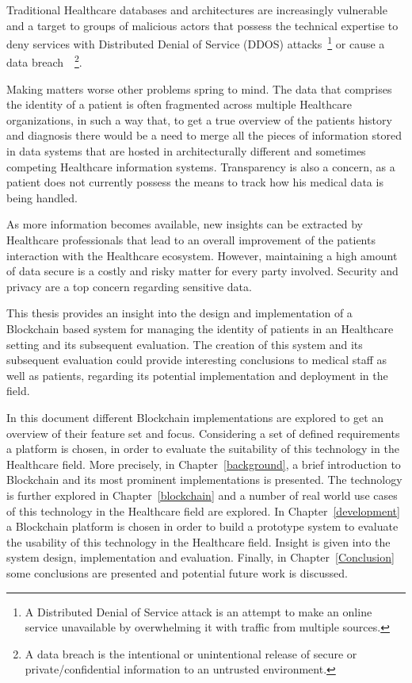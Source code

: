 Traditional Healthcare databases and architectures are increasingly vulnerable
and a target to groups of malicious actors that possess the technical expertise
to deny services with Distributed Denial of Service (DDOS) attacks~\footnote{A
Distributed Denial of Service attack is an attempt to make an online service
unavailable by overwhelming it with traffic from multiple sources.} or cause a
data breach~\cite{mcCoy2018}~\footnote{A data breach is the intentional or
unintentional release of secure or private/confidential information to an
untrusted environment.}. 

Making matters worse other problems spring to mind. The data that comprises the
identity of a patient is often fragmented across multiple Healthcare
organizations, in such a way that, to get a true overview of the patients
history and diagnosis there would be a need to merge all the pieces of
information stored in data systems that are hosted in architecturally different
and sometimes competing Healthcare information systems. Transparency is also a
concern, as a patient does not currently possess the means to track how his
medical data is being handled.

As more information becomes available, new insights can be extracted by
Healthcare professionals that lead to an overall improvement of the patients
interaction with the Healthcare ecosystem. However, maintaining a high amount
of data secure is a costly and risky matter for every party involved. Security
and privacy are a top concern regarding sensitive data. 

This thesis provides an insight into the design and implementation of a
Blockchain based system for managing the identity of patients in an Healthcare
setting and its subsequent evaluation. The creation of this system and its
subsequent evaluation could provide interesting conclusions to medical staff as
well as patients, regarding its potential implementation and deployment in the
field.

In this document different Blockchain implementations are explored to get an
overview of their feature set and focus. Considering a set of defined
requirements a platform is chosen, in order to evaluate the suitability of this
technology in the Healthcare field. More precisely, in
Chapter~\ref{background}, a brief introduction to Blockchain and its most
prominent implementations is presented. The technology is further explored in
Chapter~\ref{blockchain} and a number of real world use cases of this
technology in the Healthcare field are explored.  In Chapter~\ref{development}
a Blockchain platform is chosen in order to build a prototype system to
evaluate the usability of this technology in the Healthcare field. Insight is
given into the system design, implementation and evaluation. Finally, in
Chapter~\ref{Conclusion} some conclusions are presented and potential future
work is discussed.
